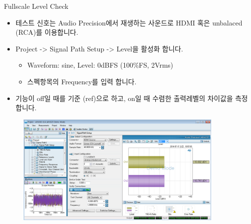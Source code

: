 \documentclass{beamer}
\begin{document}
\begin{frame}[t]{Fullscale Level Check}
\begin{itemize}
\item 테스트 신호는 Audio Precision에서 재생하는 사운드로 HDMI 혹은 unbalaced (RCA)를 이용합니다.
\item Project -> Signal Path Setup -> Level을 활성화 합니다.
	\begin{itemize}
	\item Waveform: sine, Level: 0dBFS (100\%FS, 2Vrms)
	\item 스펙항목의 Frequency를 입력 합니다.
	\end{itemize}
\item 기능이 off일 때를 기준 (ref)으로 하고, on일 때 수렴한 출력레벨의 차이값을 측정합니다.
\end{itemize}

\begin{figure}[b]
\includegraphics[width=0.9\textwidth]{figure/apsetting/fullscaleLevel.png}
\end{figure}

\end{frame}
\end{document}
